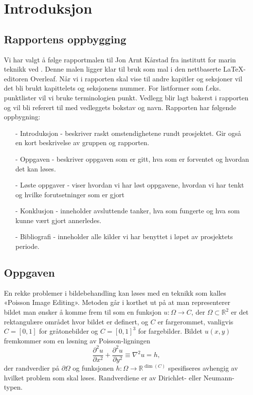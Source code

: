 \section{Introduksjon}


\subsection{Rapportens oppbygging}
Vi har valgt å følge rapportmalen til Jon Arnt Kårstad fra institutt for marin teknikk ved \newlineNTNU. Denne malen ligger klar til bruk som mal i den nettbaserte \LaTeX-editoren Overleaf. Når vi i rapporten skal vise til andre kapitler og seksjoner vil det bli brukt kapittelets og seksjonens nummer. For listformer som f.eks. punktlister vil vi bruke terminologien punkt. Vedlegg blir lagt bakerst i rapporten og vil bli referert til med vedleggets bokstav og navn. Rapporten har følgende oppbygning:
\begin{itemize}
  \item[-] Introduksjon - beskriver raskt omstendighetene rundt prosjektet. Gir også en kort beskrivelse av gruppen og rapporten.
  \item[-] Oppgaven - beskriver oppgaven som er gitt, hva som er forventet og hvordan det kan løses.
  \item[-] Løste oppgaver - viser hvordan vi har løst oppgavene, hvordan vi har tenkt og hvilke forutsetninger som er gjort
  \item[-] Konklusjon - inneholder avsluttende tanker, hva som fungerte og hva som kunne vært gjort annerledes.
  \item[-] Bibliografi - inneholder alle kilder vi har benyttet i løpet av prosjektets periode.
\end{itemize}

\subsection{Oppgaven}
En rekke problemer i bildebehandling kan løses med en teknikk som kalles «Poisson Image Editing». Metoden går i korthet ut på at man representerer bildet man ønsker å komme frem til som en funksjon $u : \Omega \to C$, der $\Omega \subset \mathbb{R}^2$ er det rektangulære området hvor bildet er definert, og $C$ er fargerommet, vanligvis $C = [0, 1]$ for gråtonebilder og $C = [0, 1]^3$ for fargebilder. Bildet $u(x, y)$ fremkommer som en løsning av Poisson-ligningen
\begin{equation}
  \frac{\partial^2 u}{\partial x^2} + \frac{\partial^2 u}{\partial y^2} \equiv \nabla^2 u = h,
  \label{eq:poisson}
\end{equation}
der randverdier på $\partial\Omega$ og funksjonen $h : \Omega \to \mathbb{R}^{\dim(C)}$ spesifiseres avhengig av hvilket problem som skal løses. Randverdiene er av Dirichlet- eller Neumann-typen.

